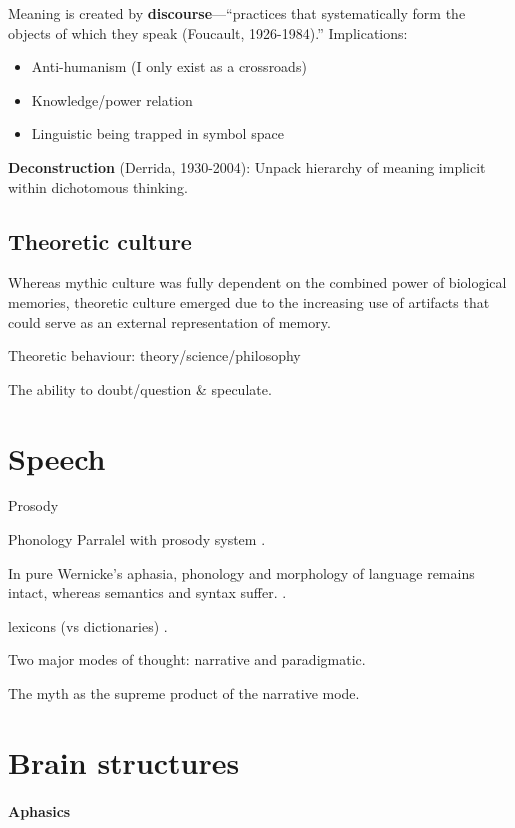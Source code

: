 \documentclass{article}
\begin{document}
Meaning is created by \textbf{discourse}---“practices that systematically form the objects of which they speak (Foucault, 1926-1984).” Implications:
\begin{itemize}
  \item Anti-humanism (I only exist as a crossroads)
  \item Knowledge/power relation
  \item Linguistic being trapped in symbol space
\end{itemize}

\textbf{Deconstruction} (Derrida, 1930-2004): Unpack hierarchy of meaning implicit within dichotomous thinking.

\subsection{Theoretic culture}

Whereas mythic culture was fully dependent on the combined power of biological
memories, theoretic culture emerged due to the increasing use of artifacts
that could serve as an external representation of memory.

Theoretic behaviour: theory/science/philosophy

The ability to doubt/question \& speculate.

\section{Speech}

Prosody

Phonology
Parralel with prosody system \citep[p.~249]{donald1991}.

In pure Wernicke's aphasia, phonology and morphology of language remains intact, whereas semantics and syntax suffer. \citep[p.~249]{donald1991}.

lexicons (vs dictionaries) \citep[fig.~7.1, p.~251]{donald1991}.

Two major modes of thought: narrative and paradigmatic.

The myth as the supreme product of the narrative mode.

\section{Brain structures}

\paragraph{Aphasics}
\end{document}
